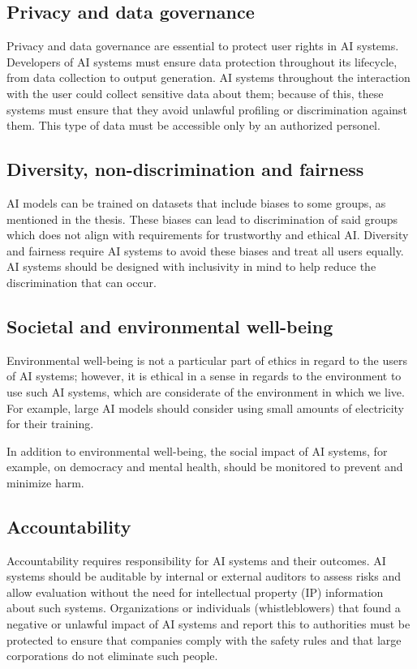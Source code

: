 \subsection*{Privacy and data governance}
Privacy and data governance are essential to protect user rights in AI systems. Developers of AI systems must ensure data protection throughout its lifecycle, from data collection to output generation. AI systems throughout the interaction with the user could collect sensitive data about them; because of this, these systems must ensure that they avoid unlawful profiling or discrimination against them. This type of data must be accessible only by an authorized personel.

\subsection*{Diversity, non-discrimination and fairness}
AI models can be trained on datasets that include biases to some groups, as mentioned in the thesis. These biases can lead to discrimination of said groups which does not align with requirements for trustworthy and ethical AI. Diversity and fairness require AI systems to avoid these biases and treat all users equally. AI systems should be designed with inclusivity in mind to help reduce the discrimination that can occur.

\subsection*{Societal and environmental well-being}
Environmental well-being is not a particular part of ethics in regard to the users of AI systems; however, it is ethical in a sense in regards to the environment to use such AI systems, which are considerate of the environment in which we live. For example, large AI models should consider using small amounts of electricity for their training.

In addition to environmental well-being, the social impact of AI systems, for example, on democracy and mental health, should be monitored to prevent and minimize harm.

\subsection*{Accountability}
Accountability requires responsibility for AI systems and their outcomes. AI systems should be auditable by internal or external auditors to assess risks and allow evaluation without the need for intellectual property (IP) information about such systems. Organizations or individuals (whistleblowers) that found a negative or unlawful impact of AI systems and report this to authorities must be protected to ensure that companies comply with the safety rules and that large corporations do not eliminate such people.

